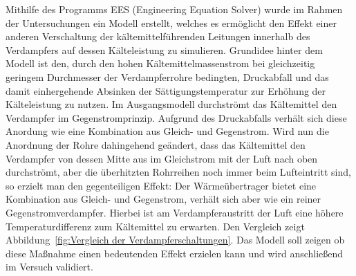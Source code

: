 Mithilfe des Programms EES (Engineering Equation Solver) wurde im Rahmen der Untersuchungen ein Modell erstellt, welches es ermöglicht den Effekt einer anderen Verschaltung der kältemittelführenden Leitungen innerhalb des Verdampfers auf dessen Kälteleistung zu simulieren. Grundidee hinter dem Modell ist den, durch den hohen Kältemittelmassenstrom bei gleichzeitig geringem Durchmesser der Verdampferrohre bedingten, Druckabfall und das damit einhergehende Absinken der Sättigungstemperatur zur Erhöhung der Kälteleistung zu nutzen. Im Ausgangsmodell durchströmt das Kältemittel den Verdampfer im Gegenstromprinzip. Aufgrund des Druckabfalls verhält sich diese Anordung wie eine Kombination aus Gleich- und Gegenstrom. Wird nun die Anordnung der Rohre dahingehend geändert, dass das Kältemittel den Verdampfer von dessen Mitte aus im Gleichstrom mit der Luft nach oben durchströmt, aber die überhitzten Rohrreihen noch immer beim Lufteintritt sind, so erzielt man den gegenteiligen Effekt: Der Wärmeübertrager bietet eine Kombination aus Gleich- und Gegenstrom, verhält sich aber wie ein reiner Gegenstromverdampfer. Hierbei ist am Verdampferaustritt der Luft eine höhere Temperaturdifferenz zum Kältemittel zu erwarten. Den Vergleich zeigt Abbildung~\ref{fig:Vergleich der Verdampferschaltungen}.
Das Modell soll zeigen ob diese Maßnahme einen bedeutenden Effekt erzielen kann und wird anschließend im Versuch validiert.


